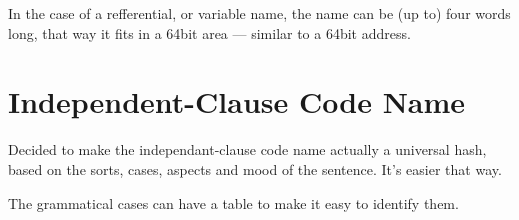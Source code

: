 In the case of a refferential, or variable name, the name can be (up to) four
words long, that way it fits in a 64bit area --- similar to a 64bit address.

\section{Independent-Clause Code Name}

Decided to make the independant-clause code name actually a universal hash,
based on the sorts, cases, aspects and mood of the sentence. It's easier that
way. 


%
%
%
The grammatical cases can have a table to make it easy to identify them. 

